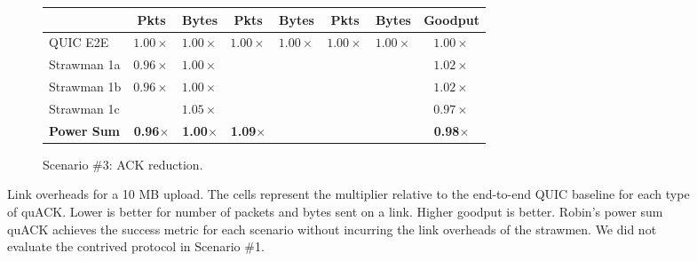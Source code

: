 \begin{figure}[h]
\begin{subfigure}{\columnwidth}
\begin{tabular}{lccccccc}
    & \bf Pkts & \bf Bytes & \bf Pkts & \bf Bytes & \bf Pkts & \bf Bytes & \bf Goodput \\
    \midrule
    QUIC E2E & $1.00\times$ & $1.00\times$ & $1.00\times$ & $1.00\times$ & $1.00\times$ & $1.00\times$ & $1.00\times$ \\
    Strawman 1a & $0.96\times$ & $1.00\times$ & \cellcolor{LightRed}{$9.94\times$} & \cellcolor{LighterRed}{$4.99\times$} & \cellcolor{LightGreen}{$0.04\times$} & \cellcolor{LightGreen}{$0.08\times$} & $1.02\times$ \\
    Strawman 1b & $0.96\times$ & $1.00\times$ & \cellcolor{LightRed}{$9.95\times$} & \cellcolor{LightRed}{$7.13\times$}      & \cellcolor{LightGreen}{$0.04\times$} & \cellcolor{LightGreen}{$0.08\times$} & $1.02\times$ \\
    Strawman 1c & \cellcolor{LightestRed}{$1.91\times$} & $1.05\times$ & \cellcolor{LightRed}{$9.73\times$} & \cellcolor{LightRed}{$7.41\times$}      & \cellcolor{LightGreen}{$0.04\times$} & \cellcolor{LightGreen}{$0.08\times$} & $0.97\times$ \\
    \bf \textcolor{black!50!blue}{Power Sum}    & \textcolor{black!50!blue}{\bf 0.96$\times$} & \textcolor{black!50!blue}{\bf 1.00$\times$} & \textcolor{black!50!blue}{\bf 1.09$\times$} & \cellcolor{LighterRed}{\textcolor{black!50!blue}{\bf 2.56$\times$}} & \cellcolor{LightGreen}{\textcolor{black!50!blue}{\bf 0.04$\times$}} & \cellcolor{LightGreen}{\textcolor{black!50!blue}{\bf 0.08$\times$}} & \textcolor{black!50!blue}{\bf 0.98$\times$} \\
    \bottomrule
  \end{tabular}
  \caption{Scenario \#3: ACK reduction.}
  \label{tab:packet-overhead:ackr}
\end{subfigure}
\caption{Link overheads for a 10 MB upload. The cells represent the multiplier
relative to the end-to-end QUIC baseline for each type of quACK\@.
Lower is better for number of packets and bytes sent on a link.
Higher goodput is better. Robin's power sum quACK achieves the success metric
for each scenario without incurring the link overheads of the strawmen.
We did not evaluate the contrived protocol in Scenario \#1.
}
\label{tab:packet-overhead}
\end{figure}
